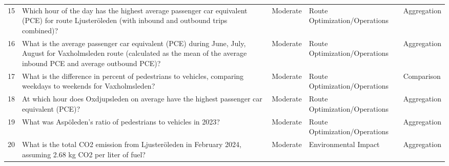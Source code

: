 \documentclass{article}
\begin{document}
\begin{longtable}{p{0.5cm}p{6cm}p{2cm}p{3cm}p{2.5cm}}
15 & Which hour of the day has the highest average passenger car equivalent (PCE) for route Ljusteröleden (with inbound and outbound trips combined)? & Moderate & Route Optimization/Operations & Aggregation \\
16 & What is the average passenger car equivalent (PCE) during June, July, August for Vaxholmsleden route (calculated as the mean of the average inbound PCE and average outbound PCE)? & Moderate & Route Optimization/Operations & Aggregation \\
17 & What is the difference in percent of pedestrians to vehicles, comparing weekdays to weekends for Vaxholmsleden? & Moderate & Route Optimization/Operations & Comparison \\
18 & At which hour does Oxdjupsleden on average have the highest passenger car equivalent (PCE)? & Moderate & Route Optimization/Operations & Aggregation \\
19 & What was Aspöleden's ratio of pedestrians to vehicles in 2023? & Moderate & Route Optimization/Operations & Aggregation \\
20 & What is the total CO2 emission from Ljusteröleden in February 2024, assuming 2.68 kg CO2 per liter of fuel? & Moderate & Environmental Impact & Aggregation \\

\end{longtable}
\end{document}
